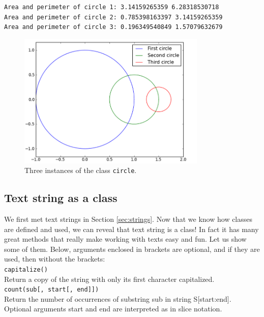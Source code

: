 \begin{verbatim}
Area and perimeter of circle 1: 3.14159265359 6.28318530718
Area and perimeter of circle 2: 0.785398163397 3.14159265359
Area and perimeter of circle 3: 0.196349540849 1.57079632679
\end{verbatim}

\newpage
\begin{figure}[!ht]
\begin{center}
\includegraphics[width=0.8\textwidth]{imgp/3circ.png}
\end{center}
\vspace{-2mm}
\caption{Three instances of the class {\tt circle}.}
\label{fig:3circ}
\end{figure}

\subsection{Text string as a class} \label{subsec:textstrclass}

We first met text strings in Section \ref{sec:strings}. Now that 
we know how classes are defined and used, we can reveal that 
text string is a class! In fact it has many great methods that 
really make working with texts easy and fun. Let us show some 
of them. Below, arguments enclosed in brackets are optional,
and if they are used, then without the brackets:\\

\noindent
{\tt capitalize()}\\
Return a copy of the string with only its first character capitalized.\\

\noindent
{\tt count(sub[, start[, end]])}\\
Return the number of occurrences of substring sub in string S[start:end]. 
Optional arguments start and end are interpreted as in slice notation.\\

